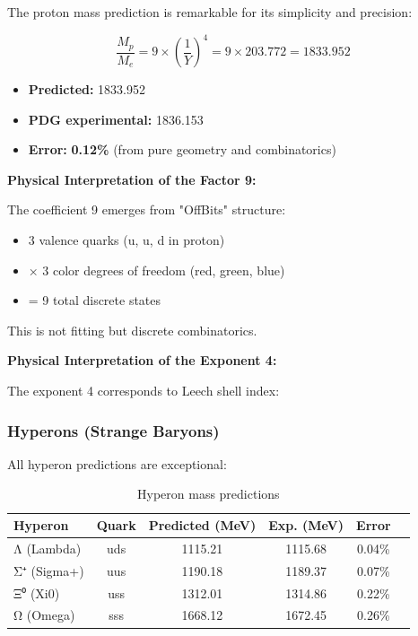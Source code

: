 \documentclass[11pt,twocolumn]{article}
\begin{document}
The proton mass prediction is remarkable for its simplicity and precision:

\begin{equation}
\frac{M_p}{M_e} = 9 \times \left(\frac{1}{Y}\right)^4 = 9 \times 203.772 = 1833.952
\end{equation}

\begin{itemize}
\item \textbf{Predicted:} 1833.952
\item \textbf{PDG experimental:} 1836.153
\item \textbf{Error:} \textbf{0.12\%} (from pure geometry and combinatorics)
\end{itemize}

\textbf{Physical Interpretation of the Factor 9:}

The coefficient 9 emerges from "OffBits" structure:
\begin{itemize}
\item 3 valence quarks (u, u, d in proton)
\item × 3 color degrees of freedom (red, green, blue)
\item = 9 total discrete states
\end{itemize}

This is not fitting but discrete combinatorics.

\textbf{Physical Interpretation of the Exponent 4:}

The exponent 4 corresponds to Leech shell index:

\subsubsection{Hyperons (Strange Baryons)}

All hyperon predictions are exceptional:

\begin{table}[H]
\centering
\caption{Hyperon mass predictions}
\begin{tabular}{lccccc}
\toprule
\textbf{Hyperon} & \textbf{Quark} & \textbf{Predicted (MeV)} & \textbf{Exp. (MeV)} & \textbf{Error} \\
\midrule
Λ (Lambda) & uds & 1115.21 & 1115.68 & 0.04\% \\
Σ⁺ (Sigma+) & uus & 1190.18 & 1189.37 & 0.07\% \\
Ξ⁰ (Xi0) & uss & 1312.01 & 1314.86 & 0.22\% \\
Ω (Omega) & sss & 1668.12 & 1672.45 & 0.26\% \\
\bottomrule
\end{tabular}
\end{table}
\end{document}
